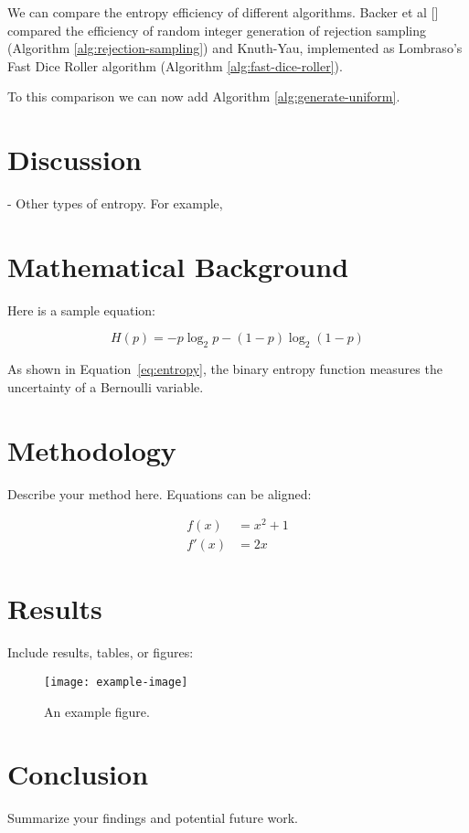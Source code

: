 \documentclass[12pt]{article}
\begin{document}
We can compare the entropy efficiency of different algorithms. Backer et al [] compared the efficiency of random integer generation of rejection sampling (Algorithm \ref{alg:rejection-sampling}) and Knuth-Yau, implemented as Lombraso's Fast Dice Roller algorithm (Algorithm \ref{alg:fast-dice-roller}).

To this comparison we can now add Algorithm \ref{alg:generate-uniform}.


\section{Discussion}

- Other types of entropy. For example, 

\section{Mathematical Background}

Here is a sample equation:

\begin{equation}
H(p) = -p \log_2 p - (1 - p) \log_2(1 - p)
\label{eq:entropy}
\end{equation}

As shown in Equation~\ref{eq:entropy}, the binary entropy function measures the uncertainty of a Bernoulli variable.

\section{Methodology}

Describe your method here. Equations can be aligned:

\begin{align}
f(x) &= x^2 + 1 \\
f'(x) &= 2x
\end{align}

\section{Results}

Include results, tables, or figures:

\begin{figure}[ht]
\centering
\texttt{[image: example-image]}
\caption{An example figure.}
\label{fig:example}
\end{figure}

\section{Conclusion}

Summarize your findings and potential future work.

\printbibliography
\end{document}
